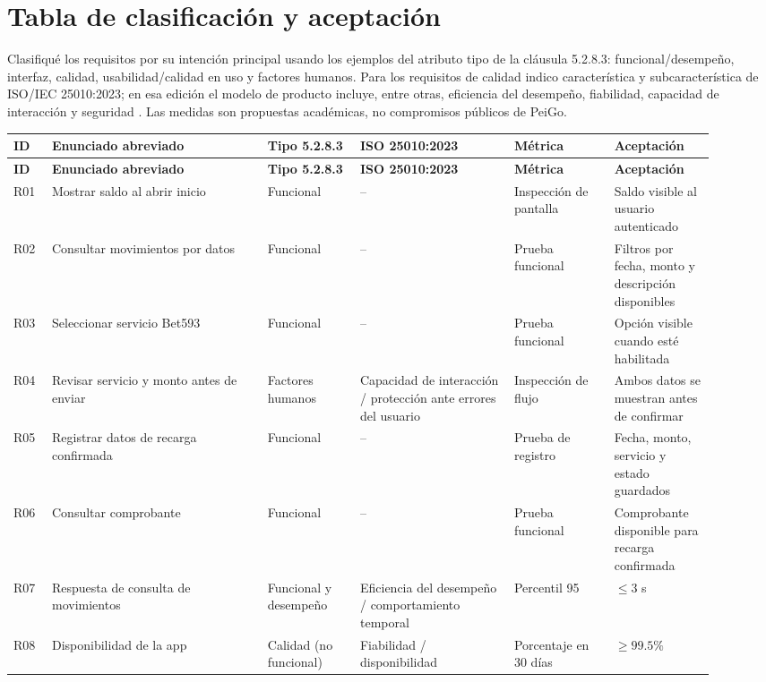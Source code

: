 \documentclass[10pt,letterpaper]{article}
\begin{document}
\section{Tabla de clasificación y aceptación}
Clasifiqué los requisitos por su intención principal usando los ejemplos del atributo tipo de la cláusula 5.2.8.3: funcional/desempeño, interfaz, calidad, usabilidad/calidad en uso y factores humanos. Para los requisitos de calidad indico característica y subcaracterística de ISO/IEC 25010:2023; en esa edición el modelo de producto incluye, entre otras, eficiencia del desempeño, fiabilidad, capacidad de interacción y seguridad \cite[cl. 5.2.8.3]{iso29148} \cite{iso25010}. Las medidas son propuestas académicas, no compromisos públicos de PeiGo.
\scriptsize
\begin{longtable}{@{}p{0.05\linewidth}p{0.28\linewidth}p{0.12\linewidth}p{0.20\linewidth}p{0.13\linewidth}p{0.13\linewidth}@{}}
\toprule\rowcolor{azulclaro}\textbf{ID}&\textbf{Enunciado abreviado}&\textbf{Tipo 5.2.8.3}&\textbf{ISO 25010:2023}&\textbf{Métrica}&\textbf{Aceptación}\\\midrule\endfirsthead
\toprule\rowcolor{azulclaro}\textbf{ID}&\textbf{Enunciado abreviado}&\textbf{Tipo 5.2.8.3}&\textbf{ISO 25010:2023}&\textbf{Métrica}&\textbf{Aceptación}\\\midrule\endhead
R01&Mostrar saldo al abrir inicio&Funcional&--&Inspección de pantalla&Saldo visible al usuario autenticado\\
R02&Consultar movimientos por datos&Funcional&--&Prueba funcional&Filtros por fecha, monto y descripción disponibles\\
R03&Seleccionar servicio Bet593&Funcional&--&Prueba funcional&Opción visible cuando esté habilitada\\
R04&Revisar servicio y monto antes de enviar&Factores humanos&Capacidad de interacción / protección ante errores del usuario&Inspección de flujo&Ambos datos se muestran antes de confirmar\\
R05&Registrar datos de recarga confirmada&Funcional&--&Prueba de registro&Fecha, monto, servicio y estado guardados\\
R06&Consultar comprobante&Funcional&--&Prueba funcional&Comprobante disponible para recarga confirmada\\
R07&Respuesta de consulta de movimientos&Funcional y desempeño&Eficiencia del desempeño / comportamiento temporal&Percentil 95&$\leq 3$ s\\
R08&Disponibilidad de la app&Calidad (no funcional)&Fiabilidad / disponibilidad&Porcentaje en 30 días&$\geq 99.5\%$\\

\end{longtable}
\end{document}
